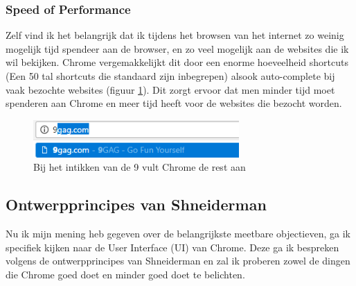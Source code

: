 \documentclass[12pt]{article}
\begin{document}
\subsubsection{Speed of Performance}
Zelf vind ik het belangrijk dat ik tijdens het browsen van het internet zo weinig mogelijk tijd spendeer aan de browser, en zo veel mogelijk aan de websites die ik wil bekijken. Chrome vergemakkelijkt dit door een enorme hoeveelheid shortcuts (Een 50 tal shortcuts die standaard zijn inbegrepen\cite{shortcuts}) alsook auto-complete bij vaak bezochte websites (figuur \ref{fig:autocomplete}). Dit zorgt ervoor dat men minder tijd moet spenderen aan Chrome en meer tijd heeft voor de websites die bezocht worden.
\begin{figure}
	\centering
	\includegraphics[width=0.7\textwidth]{autocomplete.png}
	\caption{Bij het intikken van de 9 vult Chrome de rest aan}
	\label{fig:autocomplete}
\end{figure}

\subsection{Ontwerpprincipes van Shneiderman}
Nu ik mijn mening heb gegeven over de belangrijkste meetbare objectieven, ga ik specifiek kijken naar de User Interface (UI) van Chrome. Deze ga ik bespreken volgens de ontwerpprincipes van Shneiderman en zal ik proberen zowel de dingen die Chrome goed doet en minder goed doet te belichten.
\end{document}
